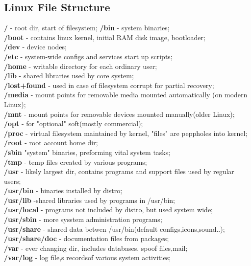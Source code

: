 \documentclass[8pt]{extarticle}
\begin{document}
\begin{multicols}{2}
\subsection{Linux File Structure}
\textbf{/} - root dir, start of filesystem;
\textbf{/bin} - system binaries; \\
\textbf{/boot} - contains linux kernel, initial RAM disk image, bootloader;\\
\textbf{/dev} - device nodes;\\
\textbf{/etc} - system-wide configs and services start up scripts;\\
\textbf{/home} - writable directory for each ordinary user;\\
\textbf{/lib} - shared libraries used by core system;\\
\textbf{/lost+found} - used in case of filesystem corrupt for partial recovery;\\
\textbf{/media} - mount points for removable media mounted automatically (on modern Linux);\\
\textbf{/mnt} - mount points for removable devices mounted manually(older Linux);\\
\textbf{/opt} - for "optional" soft(mostly commercial);\\
\textbf{/proc} - virtual filesystem maintained by kernel, "files" are peppholes into kernel;\\
\textbf{/root} - root account home dir;\\
\textbf{/sbin} "system" binaries, preforming vital system tasks;\\
\textbf{/tmp} - temp files created by various programs;\\
\textbf{/usr} - likely largest dir, contains programs and support files used by regular users;\\
\textbf{/usr/bin} - binaries installed by distro;\\
\textbf{/usr/lib} -shared libraries used by programs in /usr/bin;\\
\textbf{/usr/local} - programs not included by distro, but used system wide;\\
\textbf{/usr/sbin} - more sysstem administration programs;\\
\textbf{/usr/share} - shared data betwen /usr/bin(default configs,icons,sound..);\\
\textbf{/usr/share/doc} - documentation files from packages;\\
\textbf{/var} - ever changing dir, includes databases, spoof files,mail;\\
\textbf{/var/log} - log file,s recordsof various system activities;\\


\end{multicols}
\end{document}
